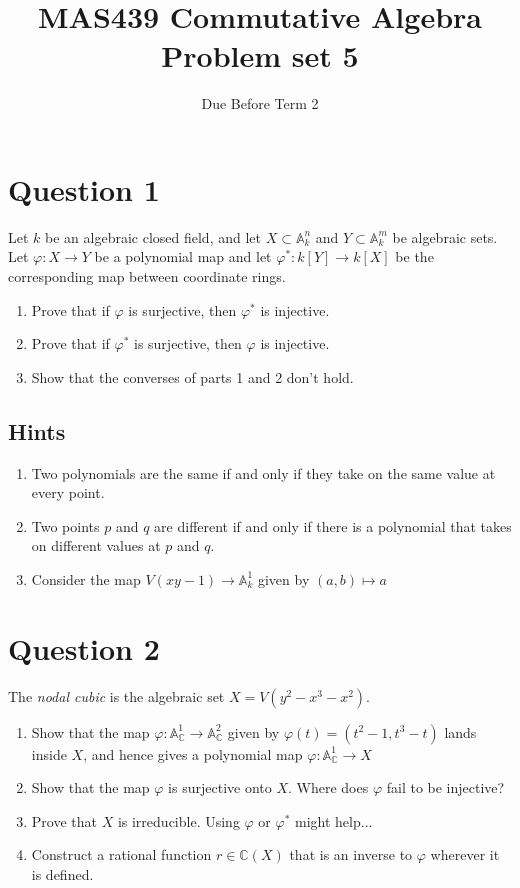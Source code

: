 \documentclass{amsart}[12pt]
\title{MAS439 Commutative Algebra \\ Problem set 5}
\author{Due Before Term 2}
\newcommand{\C}{\mathbb{C}}
\begin{document}
\maketitle
\section*{Question 1}

Let $k$ be an algebraic closed field, and let $X\subset \mathbb{A}^n_k$ and $Y\subset \mathbb{A}^m_k$ be algebraic sets.  Let $\varphi:X\to Y$ be a polynomial map and let $\varphi^*:k[Y]\to k[X]$ be the corresponding map between coordinate rings.

\begin{enumerate}
  \item Prove that if $\varphi$ is surjective, then $\varphi^*$ is injective.
\item Prove that if $\varphi^*$ is surjective, then $\varphi$ is injective.
\item  Show that the converses of parts 1 and 2 don't hold. 
\end{enumerate}

\subsection*{Hints}
\begin{enumerate}
\item Two polynomials are the same if and only if they take on the same value at every point.
\item Two points $p$ and $q$ are different if and only if there is a polynomial that takes on different values at $p$ and $q$.
  \item Consider the map $V(xy-1)\to \mathbb{A}_k^1$ given by $(a,b)\mapsto a$
\end{enumerate}
\section*{Question 2 }
The \emph{nodal cubic} is the algebraic set $X=V(y^2-x^3-x^2)$.  


\begin{enumerate}
\item Show that the map $\varphi:\mathbb{A}_{\mathbb{C}}^1\to \mathbb{A}^2_{\mathbb{C}}$ given by $\varphi(t)=(t^2-1, t^3-t)$ lands inside $X$, and hence gives a polynomial map $\varphi:\mathbb{A}^1_\C\to X$
\item Show that the map $\varphi$ is surjective onto $X$.  Where does $\varphi$ fail to be injective?   
\item Prove that $X$ is irreducible.  Using $\varphi$ or $\varphi^*$ might help...
\item Construct a rational function $r\in\C(X)$ that is an inverse to $\varphi$ wherever it is defined.
\end{enumerate}
\end{document}
